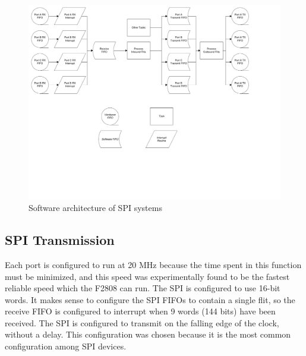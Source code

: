 \begin{landscape}
	\begin{figure}[ptb]
		\begin{centering}
			\includegraphics[width=8.5in]{SPI/Figures/spi-software_architecture.pdf}
			\caption{Software architecture of SPI systems}
			\label{fig:spi:software_architecture}
		\end{centering}
	\end{figure}
\end{landscape}

\subsection{SPI Transmission}\label{sec:spi:implementation:transmission}

Each port is configured to run at 20 MHz because the time spent in this function must be minimized, and this speed was experimentally found to be the fastest reliable speed which the F2808 can run. The SPI is configured to use 16-bit words. It makes sense to configure the SPI FIFOs to contain a single flit, so the receive FIFO is configured to interrupt when 9 words (144 bits) have been received. The SPI is configured to transmit on the falling edge of the clock, without a delay. This configuration was chosen because it is the most common configuration among SPI devices.

